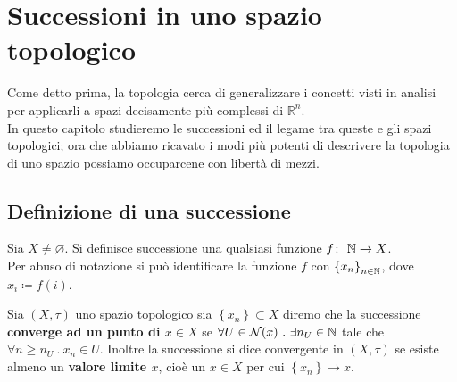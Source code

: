 \section{Successioni in uno spazio topologico}
Come detto prima, la topologia cerca di generalizzare i concetti visti in analisi per applicarli a spazi decisamente più complessi di $\mathbb{R}^n$. \\ In questo capitolo studieremo le successioni ed il legame tra queste e gli spazi topologici; ora che abbiamo ricavato i modi più potenti di descrivere la topologia di uno spazio possiamo occuparcene con libertà di mezzi.



\subsection{\textcolor{TopGener}{\textbf{Definizione di una successione}}}



\begin{definition}
	Sia $X \neq \varnothing$. Si definisce successione una qualsiasi funzione $f \colon\ \mathbb{N} \rightarrow X$. \\ Per abuso di notazione si può identificare la funzione $f$ con $\left\{x_n\right\}_{n\in\mathbb{N}}$, dove $x_i \coloneqq f(i)$.
\end{definition}

\begin{definition}
	Sia $(X, \tau)$ uno spazio topologico sia $\left\{x_n\right\} \subset X$ diremo che la successione \textbf{converge ad un punto di $x \in X$} se $\forall U \in \mathcal{N}(x)\ .\ \exists n_U \in \mathbb{N}$ tale che $\forall n \ge n_U\ .\ x_n \in U$. Inoltre la successione si dice convergente in $(X,\tau)$ se esiste almeno un \textbf{valore limite $x$}, cioè un $x \in X$ per cui $\left\{x_n\right\} \rightarrow x$.
\end{definition}

